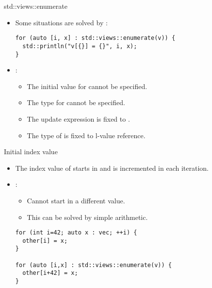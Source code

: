 \begin{frame}[t,fragile]{std::views::enumerate}
\begin{itemize}
  \item Some situations are solved by :
\begin{lstlisting}
for (auto [i, x] : std::views::enumerate(v)) {
  std::println("v[{}] = {}", i, x);
}
\end{lstlisting}

  \item {}:
    \begin{itemize}
      \item The initial value for  cannot be specified.
      \item The type for  cannot be specified.
      \item The update expression is fixed to .
      \item The type of  is fixed to l-value reference.
    \end{itemize}

\end{itemize}
\end{frame}

\begin{frame}[t,fragile]{Initial index value}
\begin{itemize}
  \item The index value of  starts in
         and is incremented in each iteration.

  \vfill\pause
  \item {}:
    \begin{itemize}
      \item Cannot start in a different value.
      \item This can be solved by simple arithmetic.
    \end{itemize}

\begin{lstlisting}
for (int i=42; auto x : vec; ++i) {
  other[i] = x;
}

for (auto [i,x] : std::views::enumerate(v)) {
  other[i+42] = x;
}
\end{lstlisting}
\end{itemize}
\end{frame}


